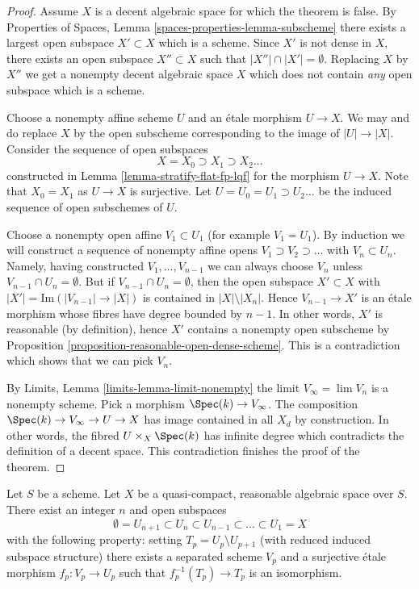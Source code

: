 \begin{proof}
Assume $X$ is a decent algebraic space for which the theorem is false. By
Properties of Spaces, Lemma \ref{spaces-properties-lemma-subscheme}
there exists a largest open subspace $X' \subset X$ which is a scheme.
Since $X'$ is not dense in $X$, there exists an open subspace
$X'' \subset X$ such that $|X''| \cap |X'| = \emptyset$. Replacing $X$
by $X''$ we get a nonempty decent algebraic space $X$ which does not
contain {\it any} open subspace which is a scheme.

\medskip\noindent
Choose a nonempty affine scheme $U$ and an \'etale morphism $U \to X$.
We may and do replace $X$ by the open subscheme corresponding to the
image of $|U| \to |X|$. Consider the sequence of open subspaces
$$
X = X_0 \supset X_1 \supset X_2 \ldots
$$
constructed in Lemma \ref{lemma-stratify-flat-fp-lqf}
for the morphism $U \to X$. Note that $X_0 = X_1$ as $U \to X$
is surjective. Let $U = U_0 = U_1 \supset U_2 \ldots$ be the induced
sequence of open subschemes of $U$.

\medskip\noindent
Choose a nonempty open affine $V_1 \subset U_1$ (for example $V_1 = U_1$).
By induction we will construct a sequence of nonempty affine opens
$V_1 \supset V_2 \supset \ldots$ with $V_n \subset U_n$. Namely, having
constructed $V_1, \ldots, V_{n - 1}$ we can always choose $V_n$ unless
$V_{n - 1} \cap U_n = \emptyset$. But if $V_{n - 1} \cap U_n = \emptyset$,
then the open subspace $X' \subset X$ with
$|X'| = \text{Im}(|V_{n - 1}| \to |X|)$ is contained in $|X| \setminus |X_n|$.
Hence $V_{n - 1} \to X'$ is an \'etale morphism whose fibres have degree
bounded by $n - 1$. In other words, $X'$ is reasonable (by definition),
hence $X'$ contains a nonempty open subscheme by
Proposition \ref{proposition-reasonable-open-dense-scheme}.
This is a contradiction which shows that we can pick $V_n$.

\medskip\noindent
By Limits, Lemma \ref{limits-lemma-limit-nonempty}
the limit $V_\infty = \lim V_n$ is a nonempty scheme. Pick a morphism
$\Spec(k) \to V_\infty$. The composition $\Spec(k) \to V_\infty \to U \to X$
has image contained in all $X_d$ by construction. In other words, the
fibred $U \times_X \Spec(k)$ has infinite degree which contradicts
the definition of a decent space. This contradiction finishes the proof
of the theorem.
\end{proof}

\begin{lemma}
\label{lemma-filter-reasonable}
Let $S$ be a scheme. Let $X$ be a quasi-compact, reasonable algebraic space
over $S$. There exist an integer $n$ and open subspaces
$$
\emptyset = U_{n + 1} \subset
U_n \subset U_{n - 1} \subset \ldots \subset U_1 = X
$$
with the following property: setting $T_p = U_p \setminus U_{p + 1}$
(with reduced induced subspace structure) there exists a separated scheme
$V_p$ and a surjective \'etale morphism $f_p : V_p \to U_p$ such that
$f_p^{-1}(T_p) \to T_p$ is an isomorphism.
\end{lemma}

